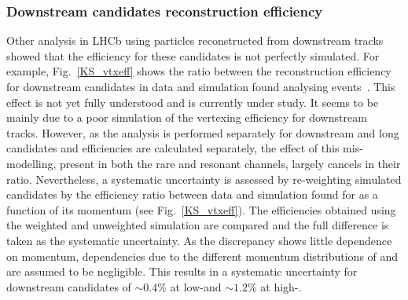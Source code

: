 \subsubsection{Downstream candidates reconstruction efficiency}


Other analysis in LHCb using particles reconstructed from downstream tracks showed that
the efficiency for these candidates is not perfectly simulated.
For example, Fig.~\ref{KS_vtxeff} shows the ratio between the reconstruction efficiency for downstream candidates
in data and simulation found analysing \KS events~\cite{Blake:1631348}. This effect is not
yet fully understood and is currently under study. It seems to be mainly due to a poor simulation
of the vertexing efficiency for downstream tracks.
%
%
However, as the analysis is performed separately for downstream and long candidates and efficiencies are calculated separately, 
the effect of this mis-modelling, present in both the rare and resonant channels, largely cancels in their ratio.
Nevertheless, a systematic uncertainty is assessed by re-weighting simulated candidates 
by the efficiency ratio between data and simulation found for \KS as a function of its momentum (see Fig.~\ref{KS_vtxeff}). 
The efficiencies obtained using the weighted and unweighted simulation are compared and the full difference is taken as the systematic uncertainty. 
As the discrepancy shows little dependence on momentum, dependencies due to the different momentum 
distributions of \Lz and \KS are assumed to be negligible. This results in a systematic uncertainty for downstream candidates
of $\sim 0.4\%$ at low-\qsq and $\sim 1.2\%$ at high-\qsq.

